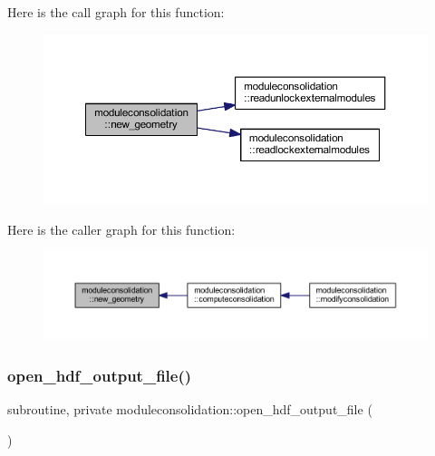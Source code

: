 Here is the call graph for this function\+:\nopagebreak
\begin{figure}[H]
\begin{center}
\leavevmode
\includegraphics[width=350pt]{namespacemoduleconsolidation_a1642d306f23b2cafb2dc89dde15f6e67_cgraph}
\end{center}
\end{figure}
Here is the caller graph for this function\+:\nopagebreak
\begin{figure}[H]
\begin{center}
\leavevmode
\includegraphics[width=350pt]{namespacemoduleconsolidation_a1642d306f23b2cafb2dc89dde15f6e67_icgraph}
\end{center}
\end{figure}
\mbox{\label{namespacemoduleconsolidation_a815002368bde1f9440c793d1c3f03f37}} 
\subsubsection{\texorpdfstring{open\+\_\+hdf\+\_\+output\+\_\+file()}{open\_hdf\_output\_file()}}
{\footnotesize\ttfamily subroutine, private moduleconsolidation\+::open\+\_\+hdf\+\_\+output\+\_\+file (\begin{DoxyParamCaption}{ }\end{DoxyParamCaption})\hspace{0.3cm}{\ttfamily [private]}}

